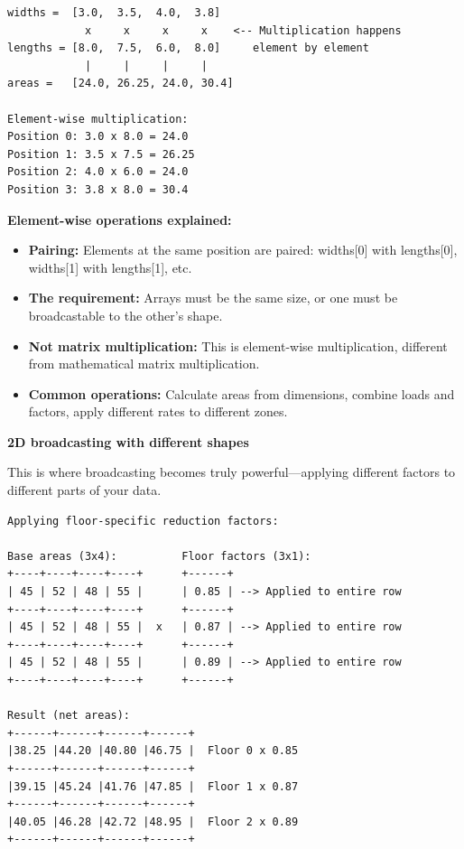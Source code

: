\begin{tcolorbox}[
    title=Broadcasting visualized,
    colframe=purple,
    colback = white,
    arc=2mm,
    breakable
]
\begin{lstlisting}[basicstyle=\ttfamily\footnotesize,breaklines=true,columns=fullflexible,keepspaces=true,xleftmargin=0pt]
widths =  [3.0,  3.5,  4.0,  3.8]
            x     x     x     x    <-- Multiplication happens
lengths = [8.0,  7.5,  6.0,  8.0]     element by element
            |     |     |     |
areas =   [24.0, 26.25, 24.0, 30.4]

Element-wise multiplication:
Position 0: 3.0 x 8.0 = 24.0
Position 1: 3.5 x 7.5 = 26.25
Position 2: 4.0 x 6.0 = 24.0
Position 3: 3.8 x 8.0 = 30.4
\end{lstlisting}

\textbf{Element-wise operations explained:}
\begin{itemize}
\item \textbf{Pairing:} Elements at the same position are paired: widths[0] with lengths[0], widths[1] with lengths[1], etc.
\item \textbf{The requirement:} Arrays must be the same size, or one must be broadcastable to the other's shape.
\item \textbf{Not matrix multiplication:} This is element-wise multiplication, different from mathematical matrix multiplication.
\item \textbf{Common operations:} Calculate areas from dimensions, combine loads and factors, apply different rates to different zones.
\end{itemize}
\vspace{2em}

\textbf{2D broadcasting with different shapes}

This is where broadcasting becomes truly powerful---applying different factors to different parts of your data.

\begin{lstlisting}[basicstyle=\ttfamily\footnotesize,breaklines=true,columns=fullflexible,keepspaces=true,xleftmargin=0pt]
Applying floor-specific reduction factors:

Base areas (3x4):          Floor factors (3x1):
+----+----+----+----+      +------+
| 45 | 52 | 48 | 55 |      | 0.85 | --> Applied to entire row
+----+----+----+----+      +------+
| 45 | 52 | 48 | 55 |  x   | 0.87 | --> Applied to entire row
+----+----+----+----+      +------+
| 45 | 52 | 48 | 55 |      | 0.89 | --> Applied to entire row
+----+----+----+----+      +------+

Result (net areas):
+------+------+------+------+
|38.25 |44.20 |40.80 |46.75 |  Floor 0 x 0.85
+------+------+------+------+
|39.15 |45.24 |41.76 |47.85 |  Floor 1 x 0.87
+------+------+------+------+
|40.05 |46.28 |42.72 |48.95 |  Floor 2 x 0.89
+------+------+------+------+


\end{lstlisting}
\end{tcolorbox}
